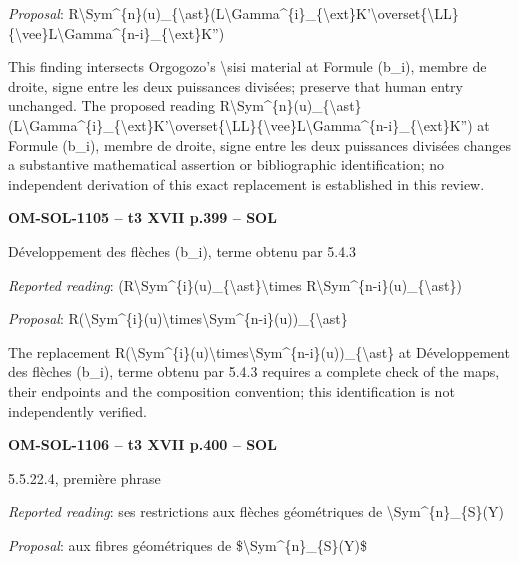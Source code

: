 \emph{Proposal}: R\textbackslash{}Sym\textasciicircum{}\{n\}(u)\_\{\textbackslash{}ast\}(L\textbackslash{}Gamma\textasciicircum{}\{i\}\_\{\textbackslash{}ext\}K'\textbackslash{}overset\{\textbackslash{}LL\}\{\textbackslash{}vee\}L\textbackslash{}Gamma\textasciicircum{}\{n-i\}\_\{\textbackslash{}ext\}K'')\par
This finding intersects Orgogozo's \textbackslash{}sisi material at Formule (b\_i), membre de droite, signe entre les deux puissances divisées; preserve that human entry unchanged. The proposed reading R\textbackslash{}Sym\textasciicircum{}\{n\}(u)\_\{\textbackslash{}ast\}(L\textbackslash{}Gamma\textasciicircum{}\{i\}\_\{\textbackslash{}ext\}K'\textbackslash{}overset\{\textbackslash{}LL\}\{\textbackslash{}vee\}L\textbackslash{}Gamma\textasciicircum{}\{n-i\}\_\{\textbackslash{}ext\}K'') at Formule (b\_i), membre de droite, signe entre les deux puissances divisées changes a substantive mathematical assertion or bibliographic identification; no independent derivation of this exact replacement is established in this review.\par
\par\noindent\textbf{OM-SOL-1105 -- t3 XVII p.399 -- SOL}\par
Développement des flèches (b\_i), terme obtenu par 5.4.3\par
\emph{Reported reading}: (R\textbackslash{}Sym\textasciicircum{}\{i\}(u)\_\{\textbackslash{}ast\}\textbackslash{}times R\textbackslash{}Sym\textasciicircum{}\{n-i\}(u)\_\{\textbackslash{}ast\})\par
\emph{Proposal}: R(\textbackslash{}Sym\textasciicircum{}\{i\}(u)\textbackslash{}times\textbackslash{}Sym\textasciicircum{}\{n-i\}(u))\_\{\textbackslash{}ast\}\par
The replacement R(\textbackslash{}Sym\textasciicircum{}\{i\}(u)\textbackslash{}times\textbackslash{}Sym\textasciicircum{}\{n-i\}(u))\_\{\textbackslash{}ast\} at Développement des flèches (b\_i), terme obtenu par 5.4.3 requires a complete check of the maps, their endpoints and the composition convention; this identification is not independently verified.\par
\par\noindent\textbf{OM-SOL-1106 -- t3 XVII p.400 -- SOL}\par
5.5.22.4, première phrase\par
\emph{Reported reading}: ses restrictions aux flèches géométriques de \textbackslash{}Sym\textasciicircum{}\{n\}\_\{S\}(Y)\par
\emph{Proposal}: aux fibres géométriques de \$\textbackslash{}Sym\textasciicircum{}\{n\}\_\{S\}(Y)\$\par
